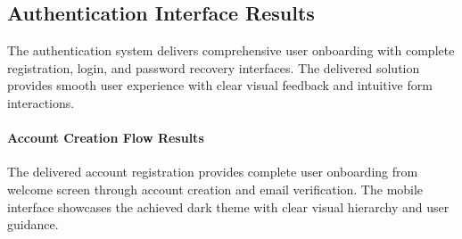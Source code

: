 \subsection{Authentication Interface Results}\label{subsec:auth_interface_results}

The authentication system delivers comprehensive user onboarding with complete registration, login, and password recovery interfaces. The delivered solution provides smooth user experience with clear visual feedback and intuitive form interactions.

\paragraph{Account Creation Flow Results}
The delivered account registration provides complete user onboarding from welcome screen through account creation and email verification. The mobile interface showcases the achieved dark theme with clear visual hierarchy and user guidance.

